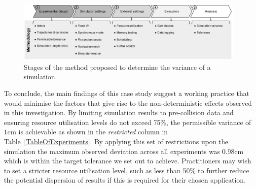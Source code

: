 \documentclass[runningheads,twocolumn,a4paper,10pt]{llncs}
\begin{document}
%
\begin{figure}[t]
    \centering
    \includegraphics[width=0.99\linewidth]{Other/Figures/Methodology_Diagram_v7.pdf}
    \caption{Stages of the method proposed to determine the variance of a simulation.}
    \label{method_diagram}
\end{figure}

 
To conclude, the main findings of this case study suggest a working practice that would minimise the factors that give rise to the non-deterministic effects observed in this investigation. 
%
By limiting simulation results to pre-collision data and ensuring resource utilisation levels do not exceed 75\%, the permissible variance of $1$cm is achievable as shown in the \textit{restricted} column in Table~\ref{TableOfExperiments}. By applying this set of restrictions upon the simulation the maximum observed deviation across all experiments was $0.98$cm which is within the target tolerance we set out to achieve. 
%
Practitioners may wish to set a stricter resource utilisation level, such as less than 50\% to further reduce the potential dispersion of results if this is required for their chosen application. 
\end{document}

